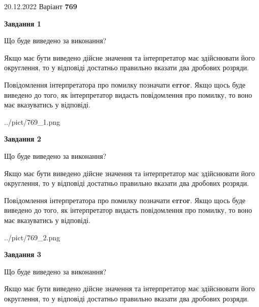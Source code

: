 \documentclass[12pt, ukrainian]{article}
\begin{document}
{20.12.2022 Варіант \No \textbf { 769 }\par}
{
\begin {Large}

{\begin {center}\textbf{Завдання 1}\end {center}}\par
Що буде виведено за виконання? \par

Якщо має бути виведено дійсне значення та інтерпретатор має здійснювати його округлення, 
то у відповіді достатньо правильно вказати два дробових розряди.

Повідомлення інтерпретатора про помилку позначати \textbf{error}.
Якщо щось буде виведено до того, як інтерпретатор видасть повідомлення про помилку, 
то воно має вказуватись у відповіді. \par

\begin{center}
	{../pict/769_1.png}
\end{center}
\newpage

{\begin {center}\textbf{Завдання 2}\end {center}}\par
Що буде виведено за виконання? \par

Якщо має бути виведено дійсне значення та інтерпретатор має здійснювати його округлення, 
то у відповіді достатньо правильно вказати два дробових розряди.

Повідомлення інтерпретатора про помилку позначати \textbf{error}.
Якщо щось буде виведено до того, як інтерпретатор видасть повідомлення про помилку, 
то воно має вказуватись у відповіді. \par

\begin{center}
	{../pict/769_2.png}
\end{center}
\newpage

{\begin {center}\textbf{Завдання 3}\end {center}}\par
Що буде виведено за виконання? \par

Якщо має бути виведено дійсне значення та інтерпретатор має здійснювати його округлення, 
то у відповіді достатньо правильно вказати два дробових розряди.


\end{Large}}
\end{document}
